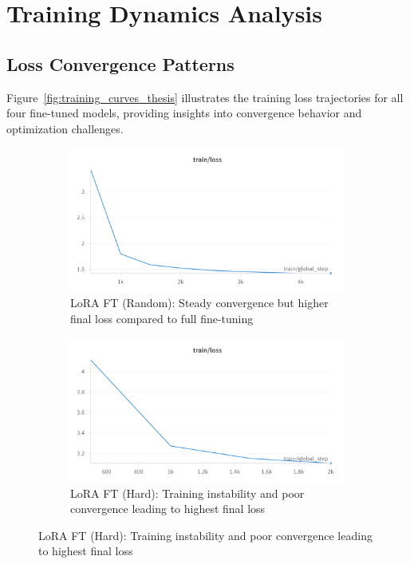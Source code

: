 \section{Training Dynamics Analysis}

\subsection{Loss Convergence Patterns}

Figure~\ref{fig:training_curves_thesis} illustrates the training loss trajectories for all four fine-tuned models, providing insights into convergence behavior and optimization challenges.

\begin{figure}[t]
\centering
\begin{subfigure}{0.48\textwidth}
\includegraphics[width=\textwidth]{lora_finetuned_1million.png}
\caption{LoRA FT (Random): Steady convergence but higher final loss compared to full fine-tuning}
\end{subfigure}
\hfill
\begin{subfigure}{0.48\textwidth}
\includegraphics[width=\textwidth]{lora_finetuned_hard_negatives.png}
\caption{LoRA FT (Hard): Training instability and poor convergence leading to highest final loss}
\end{subfigure}


\end{figure}
